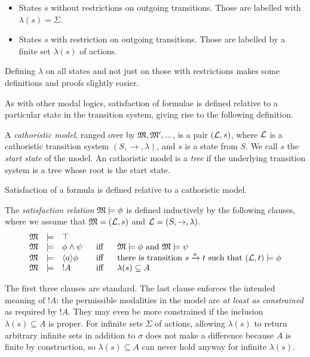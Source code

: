 \begin{itemize}

\item States $s$ without restrictions on outgoing transitions. Those are
  labelled with $\lambda ( s) = \Sigma$.

\item States $s$ with restriction on outgoing transitions. Those are
  labelled by a finite set $\lambda ( s)$ of actions.

\end{itemize}

\NI Defining $\lambda$ on all states and not just on those with
restrictions makes some definitions and proofs slightly easier.

As with other modal logics, satisfaction of formulae is defined
relative to a particular state in the transition system, giving
rise to the following definition.

\begin{definition}
A \emph{cathoristic model}, ranged over by $\frak{M}, \frak{M}', ...$, is a
pair $(\mathcal{L}, s)$, where $\mathcal{L}$ is a cathoristic transition system $(S,
\rightarrow, \lambda)$, and $s$ is a state from $S$. We call $s$ the
\emph{start state} of the model.  An cathoristic model 
 is a \emph{tree} if the underlying transition system is a tree
whose root is the start state.
\end{definition}

\NI Satisfaction of a formula is defined relative to a cathoristic model.

\begin{definition}\label{ELsatisfaction}
The \emph{satisfaction relation} $\frak{M} \models \phi$ is defined
inductively by the following clauses, where we assume that $\frak{M} =
(\mathcal{L}, s)$ and $\mathcal{L} = (S, \rightarrow, \lambda)$.
\[
\begin{array}{lclcl}
  \frak{M} & \models & \top   \\
  \frak{M} & \models & \phi \land \psi &\ \mbox{ iff } \ & \frak{M}  \models \phi \mbox { and } \frak{M} \models \psi  \\
  \frak{M} & \models & \langle a \rangle \phi & \mbox{ iff } & \text{there is transition } s \xrightarrow{a} t \mbox { such that } (\mathcal{L}, t) \models \phi  \\
  \frak{M} & \models & ! A &\mbox{ iff } & \lambda(s) \subseteq A
\end{array}
\]
\end{definition}

\NI The first three clauses are standard. The last clause enforces the
intended meaning of $!A$: the permissible modalities in the model are
\emph{at least as constrained} as required by $!A$. They may even be
more constrained if the inclusion $\lambda(s) \subseteq A$ is
proper. For infinite sets $\Sigma$ of actions, allowing $\lambda(s)$
to return arbitrary infinite sets in addition to $\sigma$ does not
make a difference because $A$ is finite by construction, so
$\lambda(s) \subseteq A$ can never hold anyway for infinite
$\lambda(s)$.

